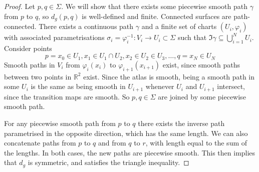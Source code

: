 \begin{proof}
	Let \( p, q \in \Sigma \).
	We will show that there exists some piecewise smooth path \( \gamma \) from \( p \) to \( q \), so \( d_g(p,q) \) is well-defined and finite.
	Connected surfaces are path-connected.
	There exists a continuous path \( \gamma \) and a finite set of charts \( (U_i, \varphi_i) \) with associated parametrisations \( \sigma_i = \varphi_i^{-1} \colon V_i \to U_i \subset \Sigma \) such that \( \Im \gamma \subseteq \bigcup_{i=1}^N U_i \).
	Consider points
	\[
		p = x_0 \in U_1, x_1 \in U_1 \cap U_2, x_2 \in U_2 \in U_3, \dots, q = x_N \in U_N
	\]
	Smooth paths in \( V_i \) from \( \varphi_i(x_i) \) to \( \varphi_{i+1}(x_{i+1}) \) exist, since smooth paths between two points in \( \mathbb R^2 \) exist.
	Since the atlas is smooth, being a smooth path in some \( U_i \) is the same as being smooth in \( U_{i+1} \) whenever \( U_i \) and \( U_{i+1} \) intersect, since the transition maps are smooth.
	So \( p,q \in \Sigma \) are joined by some piecewise smooth path.

	For any piecewise smooth path from \( p \) to \( q \) there exists the inverse path parametrised in the opposite direction, which has the same length.
	We can also concatenate paths from \( p \) to \( q \) and from \( q \) to \( r \), with length equal to the sum of the lengths.
	In both cases, the new paths are piecewise smooth.
	This then implies that \( d_g \) is symmetric, and satisfies the triangle inequality.


\end{proof}
